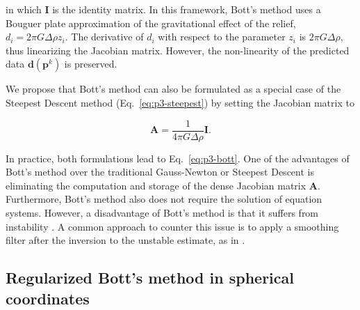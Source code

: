 \noindent
in which $\mathbf{I}$ is the identity matrix.
In this framework,
Bott's method uses a Bouguer plate approximation of the gravitational effect of
the relief, $d_i = 2\pi G \Delta\rho z_i$.
The derivative of $d_i$ with respect to the parameter $z_i$ is
$2\pi G \Delta \rho$, thus linearizing the Jacobian matrix.
However, the non-linearity of the predicted data $\mathbf{d}(\mathbf{p}^k)$ is
preserved.

We propose that Bott's method can also be formulated as a special case of the
Steepest Descent method (Eq.~\ref{eq:p3-steepest}) by setting the Jacobian matrix to

\begin{equation}
    \mathbf{A} = \dfrac{1}{4 \pi G \Delta \rho}\mathbf{I}.
    \label{eq:p3-bott-steepest}
\end{equation}

\noindent
In practice, both formulations lead to Eq.~\ref{eq:p3-bott}.
One of the advantages of Bott's method over the traditional Gauss-Newton or
Steepest Descent is eliminating the computation and storage of the dense
Jacobian matrix $\mathbf{A}$.
Furthermore, Bott's method also does not require the solution of equation
systems.
However, a disadvantage of Bott's method is that it suffers from instability
\citep{silva2014}.
A common approach to counter this issue is to apply a smoothing filter after
the inversion to the unstable estimate, as in \citet{silva2014}.



\subsection{Regularized Bott's method in spherical coordinates}

